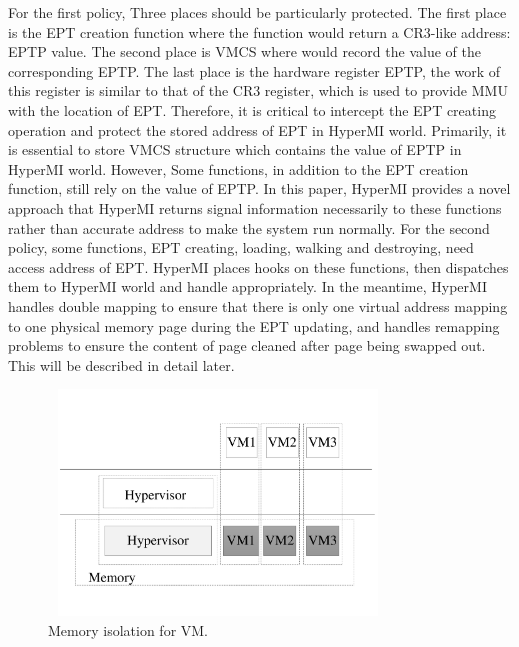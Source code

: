 \documentclass[conference]{IEEEtran}
\begin{document}
For the first policy, Three places should be particularly protected. The first place is the EPT creation function where the function would return a CR3-like address: EPTP value. The second place is VMCS where would record the value of the corresponding EPTP. The last place is the hardware register EPTP, the work of this register is similar to that of the CR3 register, which is used to provide MMU with the location of EPT. 
Therefore, it is critical to intercept the EPT creating operation and protect the stored address of EPT in HyperMI world. Primarily, it is essential to store VMCS structure which contains the value of EPTP in HyperMI world. 
However, Some functions, in addition to the EPT creation function, still rely on the value of EPTP. In this paper, HyperMI provides a novel approach that HyperMI returns signal information necessarily to these functions rather than accurate address to make the system run normally. 
For the second policy, some functions, EPT creating, loading, walking and destroying, need access address of EPT. HyperMI places hooks on these functions, then dispatches them to HyperMI world and handle appropriately. In the meantime, HyperMI handles double mapping to ensure that there is only one virtual address mapping to one physical memory page during the EPT updating, and handles remapping problems to ensure the content of page cleaned after page being swapped out. This will be described in detail later.
\begin{figure}
\centerline{\includegraphics[width=9cm, height=6cm]{pdfvmcs3.pdf}}%
\caption{Memory isolation for VM.} \label{fig3}
\end{figure}
\end{document}
